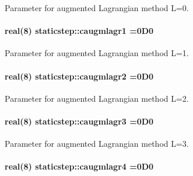Parameter for augmented Lagrangian method L=0. 

\paragraph[{\texorpdfstring{caugmlagr1}{caugmlagr1}}]{\setlength{\rightskip}{0pt plus 5cm}real(8) staticstep\+::caugmlagr1 =0\+D0\hspace{0.3cm}{\ttfamily [private]}}\hypertarget{namespacestaticstep_a871b7997d43b6cf4041af2bff9fbec5c}{}\label{namespacestaticstep_a871b7997d43b6cf4041af2bff9fbec5c}


Parameter for augmented Lagrangian method L=1. 

\paragraph[{\texorpdfstring{caugmlagr2}{caugmlagr2}}]{\setlength{\rightskip}{0pt plus 5cm}real(8) staticstep\+::caugmlagr2 =0\+D0\hspace{0.3cm}{\ttfamily [private]}}\hypertarget{namespacestaticstep_a814978f5b3d656fb78dc29ccf7d29190}{}\label{namespacestaticstep_a814978f5b3d656fb78dc29ccf7d29190}


Parameter for augmented Lagrangian method L=2. 

\paragraph[{\texorpdfstring{caugmlagr3}{caugmlagr3}}]{\setlength{\rightskip}{0pt plus 5cm}real(8) staticstep\+::caugmlagr3 =0\+D0\hspace{0.3cm}{\ttfamily [private]}}\hypertarget{namespacestaticstep_af93a45372644d111a6b47d25cfa22362}{}\label{namespacestaticstep_af93a45372644d111a6b47d25cfa22362}


Parameter for augmented Lagrangian method L=3. 

\paragraph[{\texorpdfstring{caugmlagr4}{caugmlagr4}}]{\setlength{\rightskip}{0pt plus 5cm}real(8) staticstep\+::caugmlagr4 =0\+D0\hspace{0.3cm}{\ttfamily [private]}}\hypertarget{namespacestaticstep_a41e727f971f8eb424c2156762148abc3}{}\label{namespacestaticstep_a41e727f971f8eb424c2156762148abc3}


